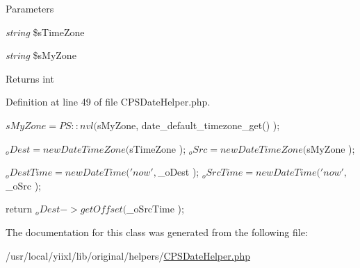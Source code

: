 \begin{DoxyParams}{Parameters}
\item[{\em string}]\$sTimeZone \item[{\em string}]\$sMyZone \end{DoxyParams}
\begin{DoxyReturn}{Returns}
int 
\end{DoxyReturn}


Definition at line 49 of file CPSDateHelper.php.




\begin{DoxyCode}
    {
        $sMyZone = PS::nvl( $sMyZone, date_default_timezone_get() );
        
        $_oDest = new DateTimeZone( $sTimeZone );
        $_oSrc = new DateTimeZone( $sMyZone );
        
        $_oDestTime = new DateTime( 'now', $_oDest );
        $_oSrcTime = new DateTime( 'now', $_oSrc );
        
        return $_oDest->getOffset( $_oSrcTime );
    }
\end{DoxyCode}




The documentation for this class was generated from the following file:\begin{DoxyCompactItemize}
\item 
/usr/local/yiixl/lib/original/helpers/\hyperlink{CPSDateHelper_8php}{CPSDateHelper.php}\end{DoxyCompactItemize}
